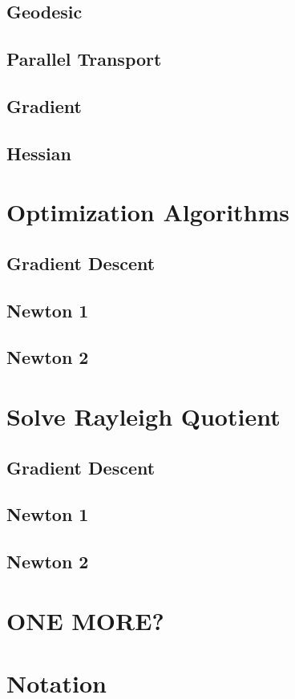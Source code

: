 \documentclass[11pt,a4paper]{report}
\begin{document}
\section{Geodesic}
\section{Parallel Transport}
\section{Gradient}
\section{Hessian}

\chapter{Optimization Algorithms}
\section{Gradient Descent}
\section{Newton 1}
\section{Newton 2}

\chapter{Solve Rayleigh Quotient}
\section{Gradient Descent}
\section{Newton 1}
\section{Newton 2}
 
\chapter{ONE MORE?} 

\chapter{Notation} 
 
\end{document}
